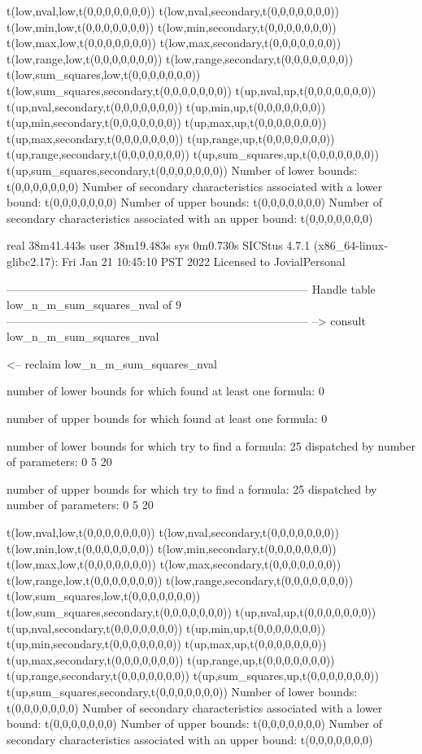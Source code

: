 t(low,nval,low,t(0,0,0,0,0,0,0))
t(low,nval,secondary,t(0,0,0,0,0,0,0))
t(low,min,low,t(0,0,0,0,0,0,0))
t(low,min,secondary,t(0,0,0,0,0,0,0))
t(low,max,low,t(0,0,0,0,0,0,0))
t(low,max,secondary,t(0,0,0,0,0,0,0))
t(low,range,low,t(0,0,0,0,0,0,0))
t(low,range,secondary,t(0,0,0,0,0,0,0))
t(low,sum_squares,low,t(0,0,0,0,0,0,0))
t(low,sum_squares,secondary,t(0,0,0,0,0,0,0))
t(up,nval,up,t(0,0,0,0,0,0,0))
t(up,nval,secondary,t(0,0,0,0,0,0,0))
t(up,min,up,t(0,0,0,0,0,0,0))
t(up,min,secondary,t(0,0,0,0,0,0,0))
t(up,max,up,t(0,0,0,0,0,0,0))
t(up,max,secondary,t(0,0,0,0,0,0,0))
t(up,range,up,t(0,0,0,0,0,0,0))
t(up,range,secondary,t(0,0,0,0,0,0,0))
t(up,sum_squares,up,t(0,0,0,0,0,0,0))
t(up,sum_squares,secondary,t(0,0,0,0,0,0,0))
Number of lower bounds:                                             t(0,0,0,0,0,0,0)
Number of secondary characteristics associated with a lower bound:  t(0,0,0,0,0,0,0)
Number of upper bounds:                                             t(0,0,0,0,0,0,0)
Number of secondary characteristics associated with an upper bound: t(0,0,0,0,0,0,0)

real	38m41.443s
user	38m19.483s
sys	0m0.730s
SICStus 4.7.1 (x86_64-linux-glibc2.17): Fri Jan 21 10:45:10 PST 2022
Licensed to JovialPersonal


--------------------------------------------------------------------------------
Handle table low_n_m_sum_squares_nval of 9
--------------------------------------------------------------------------------
--> consult low_n_m_sum_squares_nval

<-- reclaim low_n_m_sum_squares_nval

number of lower bounds for which found at least one formula: 0

number of upper bounds for which found at least one formula: 0

number of lower bounds for which try to find a formula: 25
dispatched by number of parameters: 0  5  20

number of upper bounds for which try to find a formula: 25
dispatched by number of parameters: 0  5  20

t(low,nval,low,t(0,0,0,0,0,0,0))
t(low,nval,secondary,t(0,0,0,0,0,0,0))
t(low,min,low,t(0,0,0,0,0,0,0))
t(low,min,secondary,t(0,0,0,0,0,0,0))
t(low,max,low,t(0,0,0,0,0,0,0))
t(low,max,secondary,t(0,0,0,0,0,0,0))
t(low,range,low,t(0,0,0,0,0,0,0))
t(low,range,secondary,t(0,0,0,0,0,0,0))
t(low,sum_squares,low,t(0,0,0,0,0,0,0))
t(low,sum_squares,secondary,t(0,0,0,0,0,0,0))
t(up,nval,up,t(0,0,0,0,0,0,0))
t(up,nval,secondary,t(0,0,0,0,0,0,0))
t(up,min,up,t(0,0,0,0,0,0,0))
t(up,min,secondary,t(0,0,0,0,0,0,0))
t(up,max,up,t(0,0,0,0,0,0,0))
t(up,max,secondary,t(0,0,0,0,0,0,0))
t(up,range,up,t(0,0,0,0,0,0,0))
t(up,range,secondary,t(0,0,0,0,0,0,0))
t(up,sum_squares,up,t(0,0,0,0,0,0,0))
t(up,sum_squares,secondary,t(0,0,0,0,0,0,0))
Number of lower bounds:                                             t(0,0,0,0,0,0,0)
Number of secondary characteristics associated with a lower bound:  t(0,0,0,0,0,0,0)
Number of upper bounds:                                             t(0,0,0,0,0,0,0)
Number of secondary characteristics associated with an upper bound: t(0,0,0,0,0,0,0)

